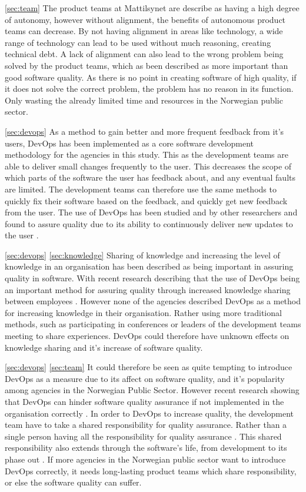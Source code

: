 \autoref{sec:team} The product teams at Mattilsynet are describe as having a high degree of autonomy, however without alignment, the benefits of autonomous product teams can decrease. By not having alignment in areas like technology, a wide range of technology can lead to be used without much reasoning, creating technical debt. A lack of alignment can also lead to the wrong problem being solved by the product teams, which as been described as more important than good software quality. As there is no point in creating software of high quality, if it does not solve the correct problem, the problem has no reason in its function. Only wasting the already limited time and resources in the Norwegian public sector. 

\autoref{sec:devops} As a method to gain better and more frequent feedback from it's users, DevOps has been implemented as a core software development methodology for the agencies in this study. This as the development teams are able to deliver small changes frequently to the user. This decreases the scope of which parts of the software the user has feedback about, and any eventual faults are limited. The development teams can therefore use the same methods to quickly fix their software based on the feedback, and quickly get new feedback from the user. The use of DevOps has been studied and by other researchers and found to assure quality due to its ability to continuously deliver new updates to the user \cite{am_2020}\cite{smm_2018}\cite{ml_2022}.

\autoref{sec:devops} \autoref{sec:knowledge} Sharing of knowledge and increasing the level of knowledge in an organisation has been described as being important in assuring quality in software. With recent research describing that the use of DevOps being an important method for assuring quality through increased knowledge sharing between employees \cite{smm_2018}\cite{mm_2021}. However none of the agencies described DevOps as a method for increasing knowledge in their organisation. Rather using more traditional methods, such as participating in conferences or leaders of the development teams meeting to share experiences. DevOps could therefore have unknown effects on knowledge sharing and it's increase of software quality.

\autoref{sec:devops} \autoref{sec:team} It could therefore be seen as quite tempting to introduce DevOps as a measure due to its affect on software quality, and it's popularity among agencies in the Norwegian Public Sector. However recent research showing that DevOps can hinder software quality assurance if not implemented in the organisation correctly \cite{dsc_2019}. In order to DevOps to increase quality, the development team have to take a shared responsibility for quality assurance. Rather than a single person having all the responsibility for quality assurance \cite{dsc_2019}. This shared responsibility also extends through the software's life, from development to its phase out \cite{dsc_2019}. If more agencies in the Norwegian public sector want to introduce DevOps correctly, it needs long-lasting product teams which share responsibility, or else the software quality can suffer.

